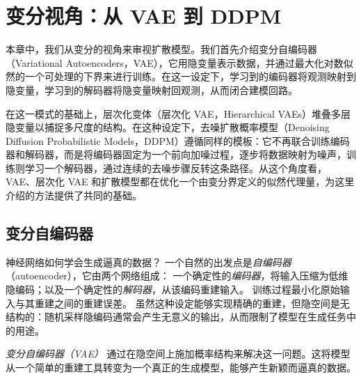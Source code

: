 \chapter{变分视角：从 VAE 到 DDPM}\label{ch:variational}


本章中，我们从变分的视角来审视扩散模型。我们首先介绍变分自编码器（Variational Autoencoders，VAE），它用隐变量表示数据，并通过最大化对数似然的一个可处理的下界来进行训练。在这一设定下，学习到的编码器将观测映射到隐变量，学习到的解码器将隐变量映射回观测，从而闭合建模回路。

在这一模式的基础上，层次化变体（层次化 VAE，Hierarchical VAEs）堆叠多层隐变量以捕捉多尺度的结构。在这种设定下，去噪扩散概率模型（Denoising Diffusion Probabilistic Models，DDPM）遵循同样的模板：它不再联合训练编码器和解码器，而是将编码器固定为一个前向加噪过程，逐步将数据映射为噪声，训练则学习一个解码器，通过连续的去噪步骤反转这条路径。从这个角度看，VAE、层次化 VAE 和扩散模型都在优化一个由变分界定义的似然代理量，为这里介绍的方法提供了共同的基础。





\newpage
\section{变分自编码器}\label{sec:vae}
神经网络如何学会生成逼真的数据？
一个自然的出发点是\emph{自编码器}（autoencoder），它由两个网络组成：
一个确定性的\emph{编码器}，将输入压缩为低维隐编码；以及一个确定性的\emph{解码器}，从该编码重建输入。
训练过程最小化原始输入与其重建之间的重建误差。
虽然这种设定能够实现精确的重建，但隐空间是无结构的：随机采样隐编码通常会产生无意义的输出，从而限制了模型在生成任务中的用途。




\emph{变分自编码器（VAE）}\citep{kingma2013auto}  通过在隐空间上施加概率结构来解决这一问题。这将模型从一个简单的重建工具转变为一个真正的生成模型，能够产生新颖而逼真的数据。



